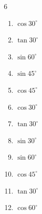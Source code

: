 \begin{multicols}{6}
\begin{enumerate}
  \item $\displaystyle \cos{30^\circ}$


  \item $\displaystyle \tan{30^\circ}$


  \item $\displaystyle \sin{60^\circ}$


  \item $\displaystyle \sin{45^\circ}$


  \item $\displaystyle \cos{45^\circ}$


  \item $\displaystyle \cos{30^\circ}$


  \item $\displaystyle \tan{30^\circ}$


  \item $\displaystyle \sin{30^\circ}$


\columnbreak %

  \item $\displaystyle \sin{60^\circ}$


  \item $\displaystyle \cos{45^\circ}$


  \item $\displaystyle \tan{30^\circ}$


  \item $\displaystyle \cos{60^\circ}$



\end{enumerate}
\end{multicols}
